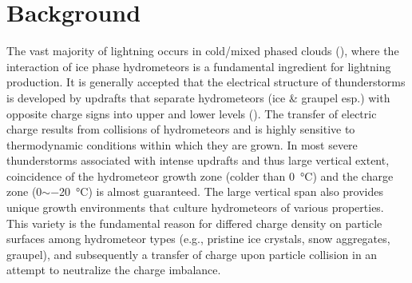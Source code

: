 
\chapter{Background}
\resetfootnote %

The vast majority of lightning occurs in cold/mixed phased clouds (\cite{wallace2006atmospheric}), where the interaction of ice phase hydrometeors is a fundamental ingredient for lightning production. It is generally accepted that the electrical structure of thunderstorms is developed by updrafts that separate hydrometeors (ice \& graupel esp.) with opposite charge signs into upper and lower levels (\cite{saunders2008charge}). The transfer of electric charge results from collisions of hydrometeors and is highly sensitive to thermodynamic conditions within which they are grown. In most severe thunderstorms associated with intense updrafts and thus large vertical extent, coincidence of the hydrometeor growth zone (colder than \SI{0}{\celsius}) and the charge zone (0$\sim$\SI{-20}{\celsius}) is almost guaranteed. The large vertical span also provides unique growth environments that culture hydrometeors of various properties. This variety is the fundamental reason for differed charge density on particle surfaces among hydrometeor types (e.g., pristine ice crystals, snow aggregates, graupel), and subsequently a transfer of charge upon particle collision in an attempt to neutralize the charge imbalance. 

